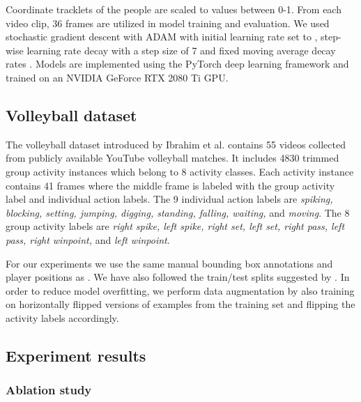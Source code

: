 \documentclass[a4paper,fleqn]{cas-dc}
\begin{document}
Coordinate tracklets of the people are scaled to values between 0-1.
From each video clip, 36 frames are utilized in model training and evaluation.
We used stochastic gradient descent with ADAM \cite{Kingma2014_adam} with initial learning rate set to , step-wise learning rate decay with a step size of 7 and fixed moving average decay rates .
Models are implemented using the PyTorch deep learning framework \cite{Paszke2019_PyTorch} and trained on an NVIDIA GeForce RTX 2080 Ti GPU.

\subsection{Volleyball dataset}
\label{subsection-volleyball-dataset}

The volleyball dataset introduced by Ibrahim et al. \cite{Ibrahim2015_volleyballPaper} contains 55 videos collected from publicly available YouTube volleyball matches. 
It includes 4830 trimmed group activity instances which belong to 8 activity classes. 
Each activity instance contains 41 frames where the middle frame is labeled with the group activity label and individual action labels. 
The 9 individual action labels are \textit{spiking, blocking, setting, jumping, digging, standing, falling, waiting,} and \textit{moving}. 
The 8 group activity labels are \textit{right spike, left spike, right set, left set, right pass, left pass, right winpoint,} and \textit{left winpoint}.

For our experiments we use the same manual bounding box annotations and player positions as \cite{Sendo2019_HeatmappingOfPeople}.
We have also followed the train/test splits suggested by \cite{Ibrahim2015_volleyballPaper}. 
In order to reduce model overfitting, we perform data augmentation by also training on horizontally flipped versions of examples from the training set and flipping the activity labels accordingly.

\subsection{Experiment results}
\label{ssec:experiment-results}

\subsubsection{Ablation study}
\label{sssec:ablation-study}
\end{document}
